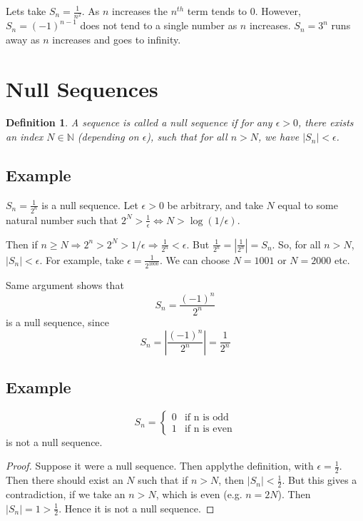 \documentclass[12pt]{scrbook}
\newtheorem*{definition}{Definition}
\begin{document}
Lets take $S_n = \frac{1}{n^2}$.  As $n$ increases the $n^{th}$ term tends to 0.  However, $S_n = (-1)^{n-1}$ does not tend to a single number as $n$ increases. $S_n  = 3^n$ runs away as $n$ increases and goes to infinity.

\section{Null Sequences}

\begin{definition}
A sequence is called a null sequence if for any $\epsilon > 0$, there exists an index $N \in \mathbb{N}$ (depending on $\epsilon$), such that for all $n > N$, we have $|S_n| < \epsilon$.
\end{definition}

\subsection{Example}
$S_n = \frac{1}{2^n}$ is a null sequence.  Let $\epsilon > 0$ be arbitrary, and take $N$ equal to some natural number such that $2^N > \frac{1}{\epsilon} \Leftrightarrow N > \log(1/\epsilon)$.

Then if $n \ge N \Rightarrow 2^n > 2^N > 1/\epsilon \Rightarrow \frac{1}{2^n} < \epsilon$.  But 
$\frac{1}{2^n} = |\frac{1}{2^n}| = S_n$.  So, for all $n > N$, $|S_n| < \epsilon$.  For example, take $\epsilon = \frac{1}{2^1000}$.
We can choose $N = 1001$ or $N = 2000$ etc.

Same argument shows that
\[ S_n = \frac{(-1)^n}{2^n} \]
is a null sequence, since
\[ S_n = \left| \frac{(-1)^n}{2^n} \right| = \frac{1}{2^n} \]

\subsection{Example}

\[
S_n = 
  \begin{cases}
    0 & \text{if n is odd} \\
    1 & \text{if n is even}
  \end{cases}
\]
is not a null sequence.
\begin{proof}
Suppose it were a null sequence.  Then applythe definition, with $\epsilon = \frac{1}{2}$.  Then there should exist an $N$ such that if $n > N$, then $|S_n| < \frac{1}{2}$.  But this gives a contradiction, if we take an $n > N$, which is even (e.g. $n = 2N$).  
Then $|S_n| = 1 > \frac{1}{2}$.  Hence it is not a null sequence.
\end{proof}
\end{document}
